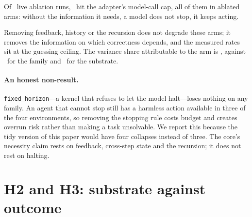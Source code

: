 \documentclass[11pt,a4paper]{article}
\begin{document}
\begin{table}[h]\centering\small
\caption{The same matrix with live models.}
\label{tab:witnesslive}

\end{table}

Of \liveruns\ live ablation runs, \livecapped\ hit the adapter's
model-call cap, all of them in ablated arms: without the information it needs,
a model does not stop, it keeps acting.

\begin{table}[h]\centering\small
\caption{Arm comparisons against \texttt{full}, paired by instance,
10{,}000-resample task-clustered bootstrap, $\pm5$\,pp equivalence band.}
\label{tab:armequiv}

\end{table}

Removing feedback, history or the recursion does not degrade these arms; it
removes the information on which correctness depends, and the measured rates
sit at the guessing ceiling. The variance share attributable to the arm is
\oracleetaarm, against \oracleetafamily\ for the family and
\oracleetakernel\ for the substrate.

\paragraph{An honest non-result.}
\texttt{fixed\_horizon}---a kernel that refuses to let the model halt---loses
nothing on any family. An agent that cannot stop still has a harmless action
available in three of the four environments, so removing the stopping rule
costs budget and creates overrun risk rather than making a task unsolvable. We
report this because the tidy version of this paper would have four collapses
instead of three. The core's necessity claim rests on feedback, cross-step
state and the recursion; it does not rest on halting.

\section{H2 and H3: substrate against outcome}
\label{sec:h2}

\begin{table}[h]\centering\small
\caption{Live witness suite, \texttt{full} arm, \subreps\ repeats, \subruns\
runs. pass$^k$ is the unbiased ``succeeds $k$ times out of $k$'' estimator.}
\label{tab:subpassk}

\end{table}

\begin{table}[h]\centering\small
\caption{Pairwise substrate equivalence on the live witness suite.}
\label{tab:subequiv}

\end{table}
\end{document}
